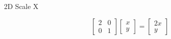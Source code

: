 \documentclass{beamer}
\begin{document}
\begin{frame}{2D Scale X}

\[ \left[ \begin{array}{cc} 2 & 0 \\ 0 & 1 \end{array} \right] \left[ \begin{array}{c} x \\ y \end{array} \right] =  \left[ \begin{array}{c} 2x \\ y  \end{array} \right] \]

\begin{figure}[t]
    \captionsetup[subfloat]{labelformat=empty}
	\centering
\end{figure}

\end{frame}
\end{document}
